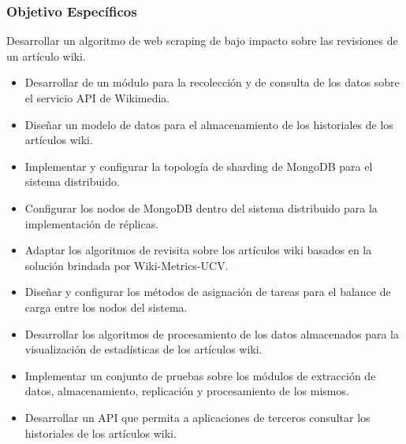 \subsubsection{Objetivo Específicos}

Desarrollar un algoritmo de web scraping de bajo impacto sobre las revisiones
de un artículo wiki.

\begin{itemize}
\item Desarrollar de un módulo para la recolección y de consulta de los datos sobre el
servicio API de Wikimedia.

\item Diseñar un modelo de datos para el almacenamiento de los historiales de los
artículos wiki.

\item Implementar y configurar la topología de sharding de MongoDB para el sistema
distribuido.

\item Configurar los nodos de MongoDB dentro del sistema distribuido para la
implementación de réplicas.

\item Adaptar los algoritmos de revisita sobre los artículos wiki basados en la solución
brindada por Wiki-Metrics-UCV.

\item Diseñar y configurar los métodos de asignación de tareas para el balance de
carga entre los nodos del sistema.

\item Desarrollar los algoritmos de procesamiento de los datos almacenados para la
visualización de estadísticas de los artículos wiki.

\item Implementar un conjunto de pruebas sobre los módulos de extracción de datos,
almacenamiento, replicación y procesamiento de los mismos.

\item Desarrollar un API que permita a aplicaciones de terceros consultar los
historiales de los artículos wiki.

\end{itemize}